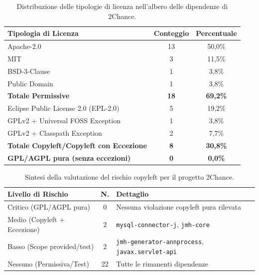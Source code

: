 \begin{table}[h]
    \centering
    \renewcommand{\arraystretch}{1.4}
    \begin{tabular}{l c c}
        \toprule
        \textbf{Tipologia di Licenza} & \textbf{Conteggio} & \textbf{Percentuale} \\
        \midrule
        Apache-2.0 & 13 & 50,0\% \\
        MIT & 3 & 11,5\% \\
        BSD-3-Clause & 1 & 3,8\% \\
        Public Domain & 1 & 3,8\% \\
        \midrule
        \textbf{Totale Permissive} & \textbf{18} & \textbf{69,2\%} \\
        \midrule
        Eclipse Public License 2.0 (EPL-2.0) & 5 & 19,2\% \\
        GPLv2 + Universal FOSS Exception & 1 & 3,8\% \\
        GPLv2 + Classpath Exception & 2 & 7,7\% \\
        \midrule
        \textbf{Totale Copyleft/Copyleft con Eccezione} & \textbf{8} & \textbf{30,8\%} \\
        \midrule
        \textbf{GPL/AGPL pura (senza eccezioni)} & \textbf{0} & \textbf{0,0\%} \\
        \bottomrule
    \end{tabular}
    \caption{Distribuzione delle tipologie di licenza nell'albero delle dipendenze di 2Chance.}
    \label{tab:license_distribution}
\end{table}

\begin{table}[h]
    \centering
    \renewcommand{\arraystretch}{1.4}
    \begin{tabular}{l c p{6.5cm}}
        \toprule
        \textbf{Livello di Rischio} & \textbf{N.} & \textbf{Dettaglio} \\
        \midrule
        Critico (GPL/AGPL pura) & 0 & Nessuna violazione copyleft pura rilevata \\
        Medio (Copyleft + Eccezione) & 2 & \texttt{mysql-connector-j}, \texttt{jmh-core} \\
        Basso (Scope provided/test) & 2 & \texttt{jmh-generator-annprocess}, \texttt{javax.servlet-api} \\
        Nessuno (Permissiva/Test) & 22 & Tutte le rimanenti dipendenze \\
        \bottomrule
    \end{tabular}
    \caption{Sintesi della valutazione del rischio copyleft per il progetto 2Chance.}
    \label{tab:risk_summary}
\end{table}

